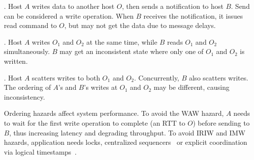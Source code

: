 .
Host $A$ writes data to another host $O$, then sends a notification to host $B$. Send can be considered a write operation.
When $B$ receives the notification, it issues read command to $O$, but may not get the data due to message delays.


.
Host $A$ writes $O_1$ and $O_2$ at the same time, while $B$ reads $O_1$ and $O_2$ simultaneously. $B$ may get an inconsistent state where only one of $O_1$ and $O_2$ is written.

.
Host $A$ scatters writes to both $O_1$ and $O_2$. Concurrently, $B$ also scatters writes. The ordering of $A$'s and $B$'s writes at $O_1$ and $O_2$ may be different, causing inconsistency. %

Ordering hazards affect system performance. To avoid the WAW hazard, $A$ needs to wait for the first write operation to complete (an RTT to $O$) before sending to $B$, thus increasing latency and degrading throughput. To avoid IRIW and IMW hazards, application needs locks, centralized sequencers~\cite{kaminsky2016design} or explicit coordination via logical timestamps~\cite{lamport1978time}.



